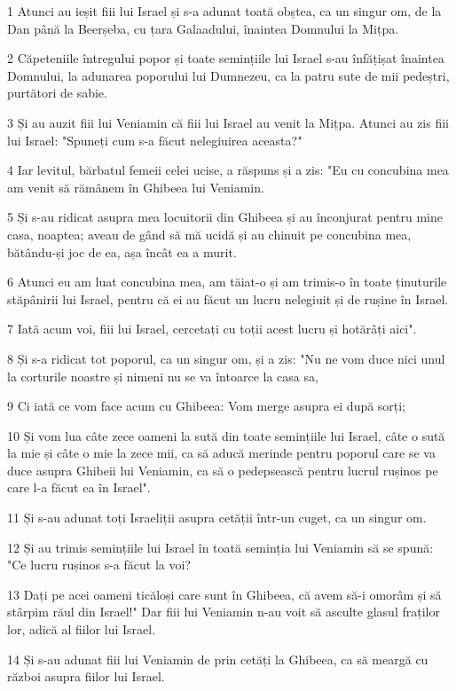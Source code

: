\par 1 Atunci au ieșit fiii lui Israel și s-a adunat toată obștea, ca un singur om, de la Dan până la Beerșeba, cu țara Galaadului, înaintea Domnului la Mițpa.
\par 2 Căpeteniile întregului popor și toate semințiile lui Israel s-au înfățișat înaintea Domnului, la adunarea poporului lui Dumnezeu, ca la patru sute de mii pedeștri, purtători de sabie.
\par 3 Și au auzit fiii lui Veniamin că fiii lui Israel au venit la Mițpa. Atunci au zis fiii lui Israel: "Spuneți cum s-a făcut nelegiuirea aceasta?"
\par 4 Iar levitul, bărbatul femeii celei ucise, a răspuns și a zis: "Eu cu concubina mea am venit să rămânem în Ghibeea lui Veniamin.
\par 5 Și s-au ridicat asupra mea locuitorii din Ghibeea și au înconjurat pentru mine casa, noaptea; aveau de gând să mă ucidă și au chinuit pe concubina mea, bătându-și joc de ea, așa încât ea a murit.
\par 6 Atunci eu am luat concubina mea, am tăiat-o și am trimis-o în toate ținuturile stăpânirii lui Israel, pentru că ei au făcut un lucru nelegiuit și de rușine în Israel.
\par 7 Iată acum voi, fiii lui Israel, cercetați cu toții acest lucru și hotărâți aici".
\par 8 Și s-a ridicat tot poporul, ca un singur om, și a zis: "Nu ne vom duce nici unul la corturile noastre și nimeni nu se va întoarce la casa sa,
\par 9 Ci iată ce vom face acum cu Ghibeea: Vom merge asupra ei după sorți;
\par 10 Și vom lua câte zece oameni la sută din toate semințiile lui Israel, câte o sută la mie și câte o mie la zece mii, ca să aducă merinde pentru poporul care se va duce asupra Ghibeii lui Veniamin, ca să o pedepsească pentru lucrul rușinos pe care l-a făcut ea în Israel".
\par 11 Și s-au adunat toți Israeliții asupra cetății într-un cuget, ca un singur om.
\par 12 Și au trimis semințiile lui Israel în toată seminția lui Veniamin să se spună: "Ce lucru rușinos s-a făcut la voi?
\par 13 Dați pe acei oameni ticăloși care sunt în Ghibeea, că avem să-i omorâm și să stârpim răul din Israel!" Dar fiii lui Veniamin n-au voit să asculte glasul fraților lor, adică al fiilor lui Israel.
\par 14 Și s-au adunat fiii lui Veniamin de prin cetăți la Ghibeea, ca să meargă cu război asupra fiilor lui Israel.
